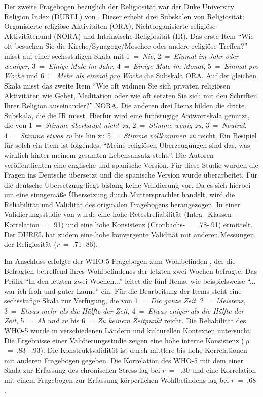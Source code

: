 Der zweite Fragebogen bezüglich der Religiosität war der Duke University Religion Index (DUREL) von \textcite{DUREL}. Dieser erhebt drei Subskalen von Religiosität: Organisierte religiöse Aktivitäten (ORA), Nichtorganisierte religiöse Aktivitätenund (NORA) und Intrinsische Religiosität (IR). Das erste Item \enquote{Wie oft besuchen Sie die Kirche/Synagoge/Moschee oder andere religiöse Treffen?} misst auf einer sechsstufigen Skala mit 1~=~\textit{Nie}, 2~=~\textit{Einmal im Jahr oder weniger}, 3~=~\textit{Einige Male im Jahr}, 4~=~\textit{Einige Male im Monat}, 5~=~\textit{Einmal pro Woche} und 6~=~\textit{Mehr als einmal pro Woche} die Subskala ORA. Auf der gleichen Skala misst das zweite Item \enquote{Wie oft widmen Sie sich privaten religiösen Aktivitäten wie Gebet, Meditation oder wie oft setzten Sie sich mit den Schriften Ihrer Religion auseinander?} NORA. 
Die anderen drei Items bilden die dritte Subskala, die die IR misst. Hierfür wird eine fünfstugige Antwortskala genutzt, die von 1~=~\textit{Stimme überhaupt nicht zu}, 2~=~\textit{Stimme wenig zu}, 3~=~\textit{Neutral}, 4~=~\textit{Stimme etwas zu} bis hin zu 5~=~\textit{Stimme vollkommen zu} reicht. Ein Besipiel für solch ein Item ist folgendes: \enquote{Meine religiösen Überzeugungen sind das, was wirklich hinter meinem gesamten Lebensansatz steht.}.
Die Autoren veröffentlichten eine englische und spanische Version. Für diese Studie wurden die Fragen ins Deutsche übersetzt und die spanische Version wurde überarbeitet. Für die deutsche Übersetzung liegt bislang keine Validierung vor. Da es sich hierbei um eine sinngemäße Übersetzung durch Muttersprachler handelt, wird die Reliabilität und Validität des originalen Fragebogens herangezogen. In einer Validierungsstudie von \textcite{DUREL_Val} wurde eine hohe Retestreliabilität (Intra$-$Klassen$-$Korrelation~=~.91) und eine hohe Konsistenz (Cronbachs-\textalpha~=~.78-.91) ermittelt. Der DUREL hat zudem eine hohe konvergente Validität mit anderen Messungen der Religiosität ($r$~=~.71-.86).

Im Anschluss erfolgte der WHO-5 Fragebogen zum Wohlbefinden \parencite{WHO-5}, der die Befragten betreffend ihres Wohlbefindenes der letzten zwei Wochen befragte. Das Präfix \enquote{In den letzten zwei Wochen...} leitet die fünf Items, wie beispielsweise \enquote{... war ich froh und guter Laune} ein. Für die Bearbeitung der Items steht eine sechsstufige Skala zur Verfügung, die von 1~=~\textit{Die ganze Zeit}, 2~=~\textit{Meistens}, 3~=~\textit{Etwas mehr als die Hälfte der Zeit}, 4~=~\textit{Etwas eniger als die Hälfte der Zeit}, 5~=~\textit{Ab und zu} bis 6~=~\textit{Zu keinem Zeitpunkt} reicht. Die Reliabilität des WHO-5 wurde in verschiedenen Ländern und kulturellen Kontexten untersucht. Die Ergebnisse einer Validierungsstudie \parencite{PhilippEtAl2020} zeigen eine hohe interne Konsistenz ($\uprho$~=~.83$-$.93). Die Konstruktvalidität ist durch mittlere bis hohe Korrelationen mit anderen Fragebögen gegeben. Die Korrelation des WHO-5 mit dem einer Skala zur Erfassung des chronischen Stress lag bei $r$~=~-.30 und eine Korrelation mit einem Fragebogen zur Erfassung körperlichen Wohlbefindens lag bei $r$~=~.68 \parencite{BrählerEtAl2007}.

